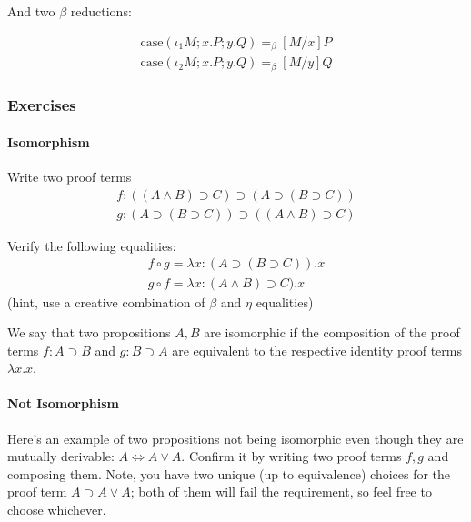 \documentclass[a4paper]{article}
\begin{document}
And two $\beta$ reductions:

\begin{gather*}
  \text{case}(\iota_1 M; x. P; y. Q) =_{\beta} [M/x]P \\
  \text{case}(\iota_2 M; x. P; y. Q) =_{\beta} [M/y]Q
\end{gather*}

\subsubsection{Exercises}
\paragraph{Isomorphism}
Write two proof terms
\begin{gather*}
  f : ((A \land B) \supset C) \supset (A \supset (B \supset C)) \\
  g : (A \supset (B \supset C)) \supset ((A \land B) \supset C)
\end{gather*}

Verify the following equalities:
\begin{gather*}
  f \circ g = \lambda x:(A \supset (B \supset C)). x \\
  g \circ f = \lambda x:(A \land B) \supset C). x
\end{gather*}
(hint, use a creative combination of $\beta$ and $\eta$ equalities)

We say that two propositions $A, B$ are isomorphic if the composition of the
proof terms $f : A \supset B$ and $g: B \supset A$ are equivalent to the
respective identity proof terms $\lambda x. x$.

\paragraph{Not Isomorphism}
Here's an example of two propositions not being isomorphic even though they are
mutually derivable: $A \Leftrightarrow A \lor A$. Confirm it by writing two
proof terms $f, g$ and composing them. Note, you have two unique (up to
equivalence) choices for the proof term $A \supset A \lor A$; both of them will fail
the requirement, so feel free to choose whichever.
\end{document}
